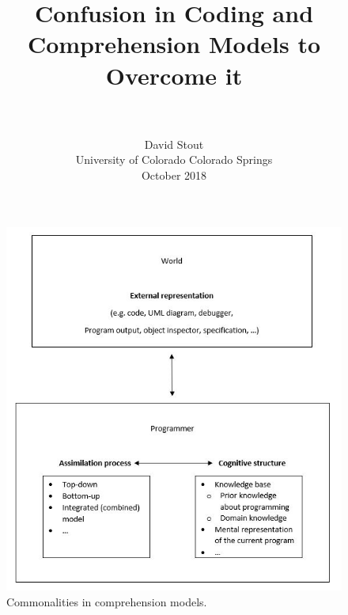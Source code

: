 \documentclass[conference, 12pt]{IEEEtran}
\title{Confusion in Coding and \\Comprehension Models to Overcome it}
\author{\\
\\
David Stout \\

University of Colorado Colorado Springs \\

October 2018}
\date{}
\begin{document}
\maketitle



\begin{figure}[ht!]
\centering
\includegraphics[scale=0.85]{images/ProgramCompModels}
\caption{Commonalities in comprehension models. \cite{noauthor_pdf_nodate}} 
\label{fig:models}
\end{figure}

%









\end{document}
